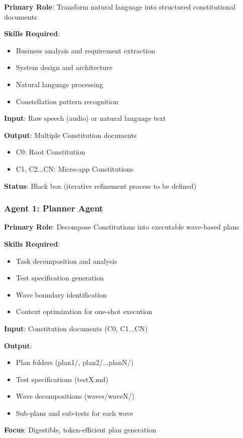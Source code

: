 \documentclass[12pt,letterpaper]{article}
\begin{document}
\begin{tcolorbox}[colback=orange!5,colframe=accentorange,title=Constitution Agent Specification]
\textbf{Primary Role}: Transform natural language into structured constitutional documents

\textbf{Skills Required}:
\begin{itemize}
    \item Business analysis and requirement extraction
    \item System design and architecture
    \item Natural language processing
    \item Constellation pattern recognition
\end{itemize}

\textbf{Input}: Raw speech (audio) or natural language text

\textbf{Output}: Multiple Constitution documents
\begin{itemize}
    \item C0: Root Constitution
    \item C1, C2...CN: Micro-app Constitutions
\end{itemize}

\textbf{Status}: Black box (iterative refinement process to be defined)
\end{tcolorbox}

\subsubsection{Agent 1: Planner Agent}

\begin{tcolorbox}[colback=green!5,colframe=secondarygreen,title=Planner Agent Specification]
\textbf{Primary Role}: Decompose Constitutions into executable wave-based plans

\textbf{Skills Required}:
\begin{itemize}
    \item Task decomposition and analysis
    \item Test specification generation
    \item Wave boundary identification
    \item Context optimization for one-shot execution
\end{itemize}

\textbf{Input}: Constitution documents (C0, C1...CN)

\textbf{Output}:
\begin{itemize}
    \item Plan folders (plan1/, plan2/...planN/)
    \item Test specifications (testX.md)
    \item Wave decompositions (waves/waveN/)
    \item Sub-plans and sub-tests for each wave
\end{itemize}

\textbf{Focus}: Digestible, token-efficient plan generation
\end{tcolorbox}
\end{document}
